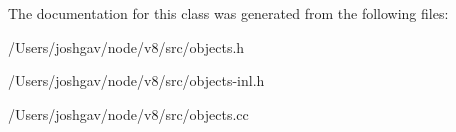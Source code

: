 The documentation for this class was generated from the following files\+:\begin{DoxyCompactItemize}
\item 
/\+Users/joshgav/node/v8/src/objects.\+h\item 
/\+Users/joshgav/node/v8/src/objects-\/inl.\+h\item 
/\+Users/joshgav/node/v8/src/objects.\+cc\end{DoxyCompactItemize}
